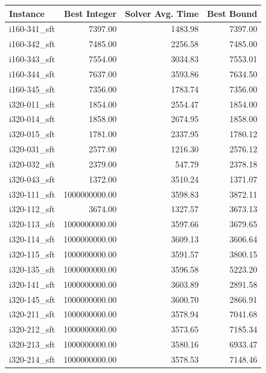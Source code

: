 \begin{tabular}{lrrr}
\toprule
Instance &  Best Integer &  Solver Avg. Time &  Best Bound \\
\midrule
i160-341\_sft &       7397.00 &           1483.98 &     7397.00 \\
i160-342\_sft &       7485.00 &           2256.58 &     7485.00 \\
i160-343\_sft &       7554.00 &           3034.83 &     7553.01 \\
i160-344\_sft &       7637.00 &           3593.86 &     7634.50 \\
i160-345\_sft &       7356.00 &           1783.74 &     7356.00 \\
i320-011\_sft &       1854.00 &           2554.47 &     1854.00 \\
i320-014\_sft &       1858.00 &           2674.95 &     1858.00 \\
i320-015\_sft &       1781.00 &           2337.95 &     1780.12 \\
i320-031\_sft &       2577.00 &           1216.30 &     2576.12 \\
i320-032\_sft &       2379.00 &            547.79 &     2378.18 \\
i320-043\_sft &       1372.00 &           3510.24 &     1371.07 \\
i320-111\_sft & 1000000000.00 &           3598.83 &     3872.11 \\
i320-112\_sft &       3674.00 &           1327.57 &     3673.13 \\
i320-113\_sft & 1000000000.00 &           3597.66 &     3679.65 \\
i320-114\_sft & 1000000000.00 &           3609.13 &     3606.64 \\
i320-115\_sft & 1000000000.00 &           3591.57 &     3800.15 \\
i320-135\_sft & 1000000000.00 &           3596.58 &     5223.20 \\
i320-141\_sft & 1000000000.00 &           3603.89 &     2891.58 \\
i320-145\_sft & 1000000000.00 &           3600.70 &     2866.91 \\
i320-211\_sft & 1000000000.00 &           3578.94 &     7041.68 \\
i320-212\_sft & 1000000000.00 &           3573.65 &     7185.34 \\
i320-213\_sft & 1000000000.00 &           3580.16 &     6933.47 \\
i320-214\_sft & 1000000000.00 &           3578.53 &     7148.46 \\

\end{tabular}
